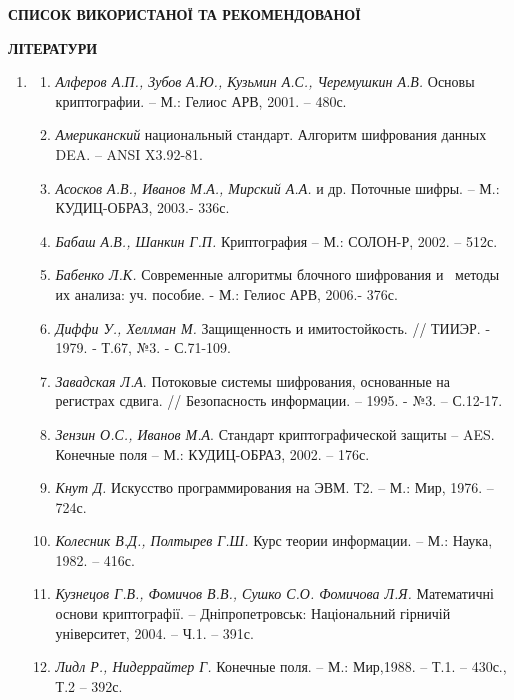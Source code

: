 \documentclass[a4paper]{article}
\newcommand\liststyleWWviiiNumli{%
\renewcommand\theenumi{\arabic{enumi}}
\renewcommand\theenumii{\arabic{enumii}}
\renewcommand\theenumiii{\Alph{enumiii}}
\renewcommand\theenumiv{\arabic{enumiv}}
\renewcommand\labelenumi{\theenumi)}
\renewcommand\labelenumii{\theenumii.}
\renewcommand\labelenumiii{\theenumiii.}
\renewcommand\labelenumiv{\theenumiv.}
}
\newcounter{}
\begin{document}
\bigskip


\bigskip

{\centering\bfseries
СПИСОК  ВИКОРИСТАНОЇ  ТА  РЕКОМЕНДОВАНОЇ
\par}

{\centering\bfseries
ЛІТЕРАТУРИ
\par}


\bigskip


\bigskip

\liststyleWWviiiNumli
\begin{enumerate}
\item \begin{enumerate}
\item \textit{Алфе}\textit{ров А.П., Зубов А.Ю., Кузьмин А.С., Черемушкин А.В.
}Основы криптографии. – М.: Гелиос АРВ,  2001. – 480с.
\item \textit{Американский} национальный стандарт. Алгоритм шифрования данных 
DEA. – ANSI X3.92-81. 
\item \textit{Асосков А.В., Иванов М.А., Мирский А.А.} и др. Поточные шифры. –
М.: КУДИЦ-ОБРАЗ, 2003.- 336с.
\item \textit{Бабаш А.В., Шанкин Г.П.} Криптография – М.: СОЛОН-Р, 2002. – 512с.
\item {\color[rgb]{0.2,0.2,0.2}
 \textit{Бабенко Л.К.} Современные алгоритмы блочного шифрования и~ методы их
анализа: уч. пособие. - М.: Гелиос АРВ, 2006.- 376с.}
\item {\color[rgb]{0.2,0.2,0.2}
 \textit{Диффи У., Хеллман М.} Защищенность и имитостойкость. // ТИИЭР. - 1979.
- Т.67, №3. - С.71-109.}
\item \textit{Завадская Л.А}. Потоковые системы шифрования, основанные на
регистрах сдвига. // Безопасность информации. – 1995. - №3. – С.12-17.
\item \textit{Зензин О.С., Иванов М.А}. Стандарт криптографической защиты – AES.
 Конечные поля – М.: КУДИЦ-ОБРАЗ, 2002. –  176с.
\item \textit{Кнут Д.} Искусство программирования на ЭВМ. Т2. – М.: Мир, 1976. –
724с.
\item \textit{Колесник В.Д., Полтырев Г.Ш.} Курс теории информации. – М.: Наука,
1982. – 416с. 
\item \textit{Кузнецов Г.В., Фомич}\textit{о}\textit{в В.В., Сушко С.О. Фомичова
Л.Я. }Математичні основи криптографії. – Дніпропетровськ: Національний гірничій
університет, 2004. – Ч.1. – 391с.
\item \textit{ }\textit{Лидл Р., Нидеррайтер Г.} Конечные поля. – М.: Мир,1988.
–  Т.1. – 430с., Т.2 – 392с.

\end{enumerate}
\end{enumerate}
\end{document}
